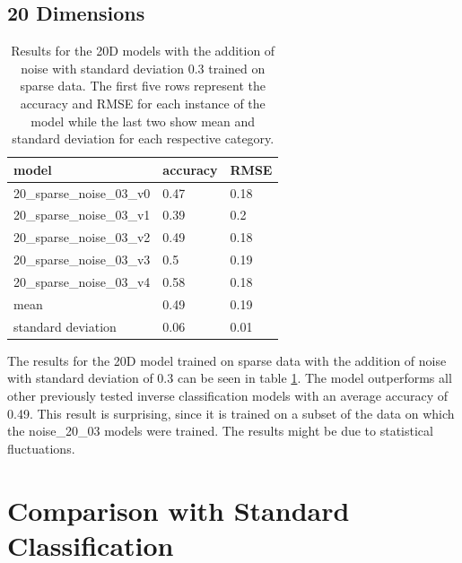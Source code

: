 \subsection{20 Dimensions}  

\begin{table}[!htb]
	\centering
	\caption{Results for the 20D models with the addition of noise with standard deviation 0.3 trained on sparse data. The first five rows represent the accuracy and RMSE for each instance of the model while the last two show mean and standard deviation for each respective category.}
	\begin{tabularx}{\textwidth}{ X  X  X }
		\hline
		model & accuracy & RMSE \\ 
		\hline
		20\_sparse\_noise\_03\_v0 & 0.47 & 0.18\\ 
		20\_sparse\_noise\_03\_v1 & 0.39 & 0.2 \\
		20\_sparse\_noise\_03\_v2 & 0.49 & 0.18 \\ 
		20\_sparse\_noise\_03\_v3 & 0.5  & 0.19 \\ 
		20\_sparse\_noise\_03\_v4 & 0.58 & 0.18 \\ \hline
		mean & 0.49 & 0.19\\
		standard deviation & 0.06 & 0.01\\
		\hline
	\end{tabularx}
	\label{table:20_sparse_noise_03}
\end{table}

The results for the 20D model trained on sparse data with the addition of noise with standard deviation of 0.3 can be seen in table \ref{table:20_sparse_noise_03}. The model outperforms all other previously tested inverse classification models with an average accuracy of 0.49. This result is surprising, since it is trained on a subset of the data on which the noise\_20\_03 models were trained. The results might be due to statistical fluctuations.

\section{Comparison with Standard Classification}

